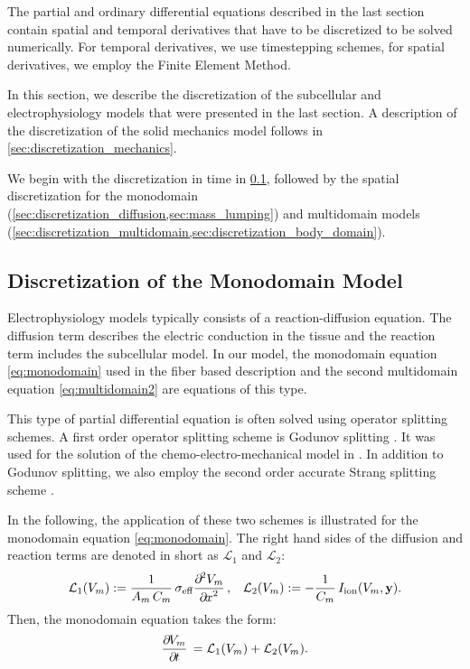 The partial and ordinary differential equations described in the last section contain spatial and temporal derivatives that have to be discretized to be solved numerically. For temporal derivatives, we use timestepping schemes, for spatial derivatives, we employ the Finite Element Method.

In this section, we describe the discretization of the subcellular and electrophysiology models that were presented in the last section. A description of the discretization of the solid mechanics model follows in \cref{sec:discretization_mechanics}.

We begin with the discretization in time in \cref{sec:discretization_monodomain}, followed by the spatial discretization for the monodomain (\cref{sec:discretization_diffusion,sec:mass_lumping}) and multidomain models (\cref{sec:discretization_multidomain,sec:discretization_body_domain}).

\subsection{Discretization of the Monodomain Model}\label{sec:discretization_monodomain}

Electrophysiology models typically consists of a reaction-diffusion equation. The diffusion term describes the electric conduction in the tissue and the reaction term includes the subcellular model. In our model, the monodomain equation  \cref{eq:monodomain} used in the fiber based description and the second multidomain equation \cref{eq:multidomain2} are equations of this type.

This type of partial differential equation is often solved using operator splitting schemes. A first order operator splitting scheme is Godunov splitting \cite{Godunov2003}. It was used for the solution of the chemo-electro-mechanical model in \cite{Roehrle2012}. In addition to Godunov splitting, we also employ the second order accurate Strang splitting scheme \cite{Strang1968}.

In the following, the application of these two schemes is illustrated for the monodomain equation \cref{eq:monodomain}. The right hand sides of the diffusion and reaction terms are denoted in short as $\mathcal{L}_1$ and $\mathcal{L}_2$:%
\begin{align*}
  \mathcal{L}_1(V_m) := \dfrac{1}{A_m\,C_m} \sigma_\text{eff}\dfrac{\partial^2 V_m}{\partial x^2}, &&
  \mathcal{L}_2(V_m) := -\dfrac{1}{C_m} I_\text{ion}(V_m,\bfy).
\end{align*}
%
Then, the monodomain equation takes the form:
%
\begin{align}\label{eq:monodomain_operator_splitting}
  \p{V_m}{t} = \mathcal{L}_1(V_m) + \mathcal{L}_2(V_m).
\end{align}

